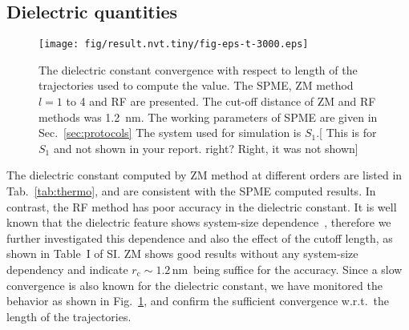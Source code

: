 \documentclass[a4paper,preprint,unsortedaddress,onecolumn,fleqn]{revtex4}
\newcommand{\recheck}[1]{{\color{red} #1}}
\newcommand{\systemlb}{L_1}
\begin{document}

\subsection{Dielectric quantities}

\begin{figure}[tbp]
\centering
\texttt{[image: fig/result.nvt.tiny/fig-eps-t-3000.eps]}
\caption{The dielectric constant convergence with respect to length of the
trajectories used to compute the value. The SPME, ZM method $l=1$ to 4 and
RF are presented. The cut-off distance of ZM and RF methods was 1.2~nm. The
working parameters of SPME are given in Sec.~\protect\ref{sec:protocols} The
system used for simulation is $S_{1}$.[ {\color{blue} This is for $S_{1}$
and not shown in your report. right? } \recheck{Right, it was not shown}]}
\label{fig:eps-conv}
\end{figure}

The dielectric constant computed by ZM method at different orders are listed
in Tab.~\ref{tab:thermo}, and are consistent with the SPME computed results.
In contrast, the RF method has poor accuracy in the dielectric constant. It
is well known that the dielectric feature shows system-size dependence~\cite{vanderSpoel2006origin},
therefore we further investigated this dependence
and also the effect of the cutoff length, as shown in Table~I of SI. ZM
shows good results without any system-size dependency and indicate $r_{\text{c}}\sim 1.2\,$nm\ being suffice for
the accuracy. Since a slow convergence is also known for the dielectric
constant, we have monitored the behavior as shown in Fig.~\ref{fig:eps-conv},
and confirm the sufficient convergence w.r.t.~the length of the
trajectories.
\end{document}
